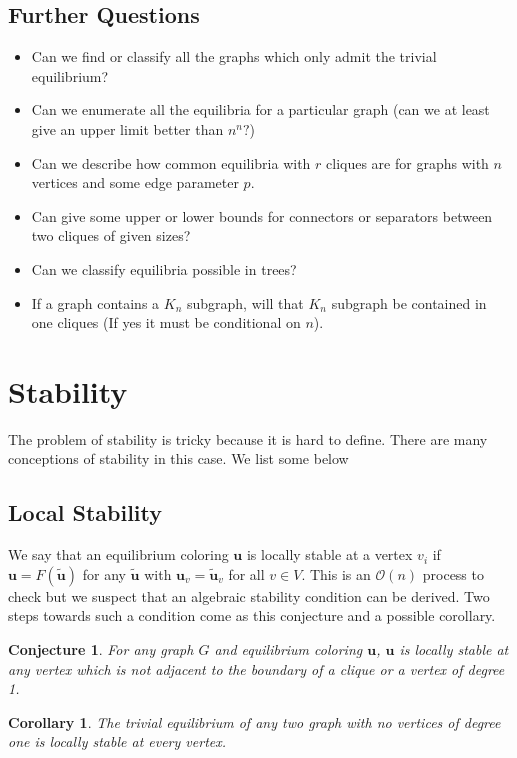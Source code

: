 \documentclass[]{article}
\newtheorem{conjecture}[theorem]{Conjecture}
\newtheorem{corrollary}[theorem]{Corollary}
\begin{document}
\subsection{Further Questions}

\begin{itemize}
	\item Can we find or classify all the graphs which only admit the trivial equilibrium? 
	\item Can we enumerate all the equilibria for a particular graph (can we at least give an upper limit better than $n^n?$)
	\item Can we describe how common equilibria with $r$ cliques are for graphs with $n$ vertices and some edge parameter $p$. 
	\item Can give some upper or lower bounds for connectors or separators between two cliques of given sizes?
	\item Can we classify equilibria possible in trees?
	\item If a graph contains a $K_n$ subgraph, will that $K_n$ subgraph be contained in one cliques (If yes it must be conditional on $n$).
\end{itemize}
\section{Stability}
The problem of stability is tricky because it is hard to define. There are many conceptions of stability in this case. We list some below
\subsection{Local Stability} We say that an equilibrium coloring $\mathbf{u}$ is locally stable at a vertex $v_i$ if $\mathbf{u}=F(\tilde{\mathbf{u}})$ for any $\tilde{\mathbf{u}}$ with $\mathbf{u}_{v}=\tilde{\mathbf{u}}_{v}$ for all $v\in V$. This is an $\mathcal{O}(n)$ process to check but we suspect that an algebraic stability condition can be derived. Two steps towards such a condition come as this conjecture and a possible corollary.
\begin{conjecture}
	For any graph $G$ and equilibrium coloring $\mathbf{u}$, $\mathbf{u}$ is locally stable at any vertex which is not adjacent to the boundary of a clique or a vertex of degree 1. 
\end{conjecture} 
\begin{corrollary}
	The trivial equilibrium of any two graph with no vertices of degree one is locally stable at every vertex.
\end{corrollary}
\end{document}
